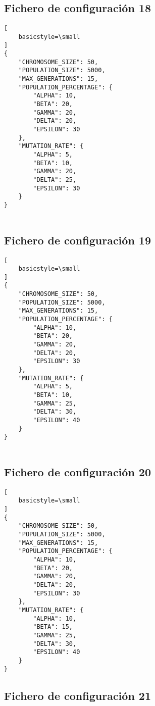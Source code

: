 \subsection{Fichero de configuración 18} \label{subsect:config_file_18}

\begin{lstlisting}[
    basicstyle=\small
]
{
    "CHROMOSOME_SIZE": 50,
    "POPULATION_SIZE": 5000,
    "MAX_GENERATIONS": 15,
    "POPULATION_PERCENTAGE": {
        "ALPHA": 10,
        "BETA": 20,
        "GAMMA": 20,
        "DELTA": 20,
        "EPSILON": 30
    },
    "MUTATION_RATE": {
        "ALPHA": 5,
        "BETA": 10,
        "GAMMA": 20,
        "DELTA": 25,
        "EPSILON": 30
    }
}
   
\end{lstlisting}

\subsection{Fichero de configuración 19} \label{subsect:config_file_19}

\begin{lstlisting}[
    basicstyle=\small
]
{
    "CHROMOSOME_SIZE": 50,
    "POPULATION_SIZE": 5000,
    "MAX_GENERATIONS": 15,
    "POPULATION_PERCENTAGE": {
        "ALPHA": 10,
        "BETA": 20,
        "GAMMA": 20,
        "DELTA": 20,
        "EPSILON": 30
    },
    "MUTATION_RATE": {
        "ALPHA": 5,
        "BETA": 10,
        "GAMMA": 25,
        "DELTA": 30,
        "EPSILON": 40
    }
}
   
\end{lstlisting}

\subsection{Fichero de configuración 20} \label{subsect:config_file_20}

\begin{lstlisting}[
    basicstyle=\small
]
{
    "CHROMOSOME_SIZE": 50,
    "POPULATION_SIZE": 5000,
    "MAX_GENERATIONS": 15,
    "POPULATION_PERCENTAGE": {
        "ALPHA": 10,
        "BETA": 20,
        "GAMMA": 20,
        "DELTA": 20,
        "EPSILON": 30
    },
    "MUTATION_RATE": {
        "ALPHA": 10,
        "BETA": 15,
        "GAMMA": 25,
        "DELTA": 30,
        "EPSILON": 40
    }
}
\end{lstlisting}

\subsection{Fichero de configuración 21} \label{subsect:config_file_21}

